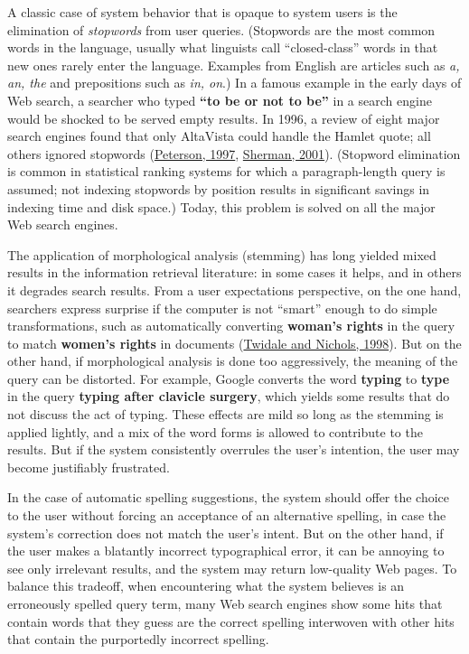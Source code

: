 \documentclass[sigconf,nonacm,screen,pbalance]{acmart}
\begin{document}
A classic case of system behavior that is opaque to system users is the elimination of {\em  stopwords}
from user queries. (Stopwords are the most common words in the language, usually what linguists call
``closed-class'' words in that new ones rarely enter the language. Examples from English are articles such
as {\em  a, an, the} and prepositions such as {\em  in, on}.) In a famous example in the early days of
Web search, a searcher who typed {\bf  ``to be or not to be''} in a search engine would be shocked to be
served empty results. In 1996, a review of eight major search engines found that only AltaVista could
handle the Hamlet quote; all others ignored stopwords (\href{https://searchuserinterfaces.com/book/sui_references.html#peterson1997eis}{Peterson, 1997}, \href{https://searchuserinterfaces.com/book/sui_references.html#sherman01}{ Sherman, 2001}). (Stopword elimination is common in statistical ranking
systems for which a paragraph-length query is assumed; not indexing stopwords by position results in
significant savings in indexing time and disk space.) Today, this problem is solved on all the major Web
search engines.

The application of morphological analysis (stemming) has long yielded mixed results in the information
retrieval literature: in some cases it helps, and in others it degrades search results. From a user
expectations perspective, on the one hand, searchers express surprise if the computer is not ``smart''
enough to do simple transformations, such as automatically converting {\bf  woman's rights} in the
query to match {\bf  women's rights} in documents (\href{https://searchuserinterfaces.com/book/sui_references.html#twidale1998dis}{Twidale and Nichols, 1998}). But on the other
hand, if morphological analysis is done too aggressively, the meaning of the query can be distorted. For
example, Google converts the word {\bf  typing} to {\bf  type} in the query {\bf  typing after clavicle
surgery}, which yields some results that do not discuss the act of typing. These effects are mild
so long as the stemming is applied lightly, and a mix of the word forms is allowed to contribute to the
results. But if the system consistently overrules the user's intention, the user may become justifiably
frustrated.

In the case of automatic spelling suggestions, the system should offer the choice to the user without
forcing an acceptance of an alternative spelling, in case the system's correction does not match the
user's intent. But on the other hand, if the user makes a blatantly incorrect typographical error, it
can be annoying to see only irrelevant results, and the system may return low-quality Web pages. To
balance this tradeoff, when encountering what the system believes is an erroneously spelled query term,
many Web search engines show some hits that contain words that they guess are the correct spelling
interwoven with other hits that contain the purportedly incorrect spelling.
\end{document}
